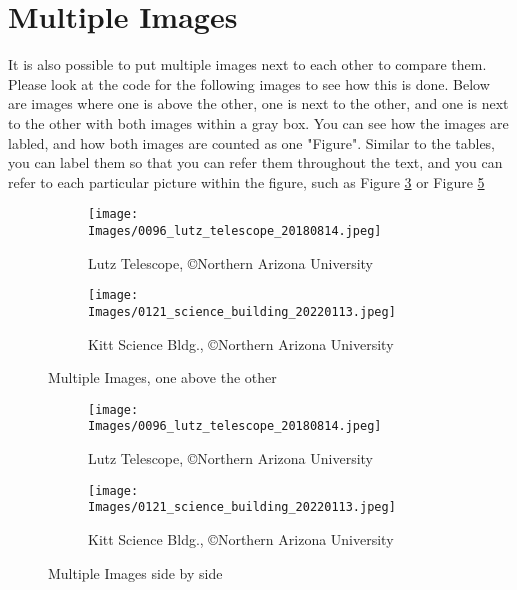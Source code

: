 \documentclass[10pt]{article}
\begin{document}
\newpage
\section*{Multiple Images}

It is also possible to put multiple images next to each other to compare them. Please look at the code for the following images to see how this is done. Below are images where one is above the other, one is next to the other, and one is next to the other with both images within a gray box. You can see how the images are labled, and how both images are counted as one "Figure". Similar to the tables, you can label them so that you can refer them throughout the text, and you can refer to each particular picture within the figure, such as Figure \ref{fig:kitt} or Figure \ref{fig:kittbldg1}

\begin{figure} [H]
\centering
\begin{subfigure}{1\textwidth}
  \centering
  \texttt{[image: Images/0096\_lutz\_telescope\_20180814.jpeg]}
  \caption{Lutz Telescope, \copyright Northern Arizona University}
  \label{fig:lutz}
\end{subfigure}
\begin{subfigure}{1\textwidth}
  \centering
  \texttt{[image: Images/0121\_science\_building\_20220113.jpeg]}
  \caption{Kitt Science Bldg., \copyright Northern Arizona University}
  \label{fig:KempfT}
\end{subfigure}
\caption{Multiple Images, one above the other}
\label{fig:kitt}
\end{figure}

\begin{figure}[H]
\centering
\begin{subfigure}{0.48\textwidth}
  \centering
  \texttt{[image: Images/0096\_lutz\_telescope\_20180814.jpeg]}
  \caption{Lutz Telescope, \copyright Northern Arizona University}
  \label{fig:lutz1}
\end{subfigure}
\hfill
\begin{subfigure}{0.48\textwidth}
  \centering
  \texttt{[image: Images/0121\_science\_building\_20220113.jpeg]}
  \caption{Kitt Science Bldg., \copyright Northern Arizona University}
  \label{fig:kittbldg1}
\end{subfigure}
\caption{Multiple Images side by side}
\label{fig:side}
\end{figure}
\end{document}
